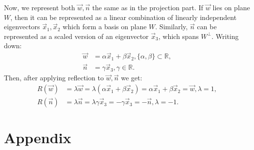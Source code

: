 \documentclass{article}
\begin{document}
Now, we represent both $\vec{w},\vec{n}$ the same as in the projection part. If $\vec{w}$ lies on plane $W$, then it can be represented as a linear combination of linearly independent eigenvectors $\vec{x}_1,\vec{x}_2$ which form a basis on plane $W$. Similarly, $\vec{n}$ can be represented as a scaled version of an eigenvector $\vec{x}_3$, which spans $W^\perp$. Writing down:
\begin{align*}
	\vec{w}&=\alpha\vec{x}_1+\beta\vec{x}_2,\{\alpha,\beta\}\subset \mathbb{R},\\
	\vec{n}&=\gamma\vec{x}_3,\gamma\in\mathbb{R}.
\end{align*}
Then, after applying reflection to $\vec{w},\vec{n}$ we get:
\begin{align*}
	R(\vec{w})&=\lambda\vec{w}=\lambda\left(\alpha\vec{x}_1+\beta\vec{x}_2\right)=\alpha\vec{x}_1+\beta\vec{x}_2=\vec{w},\lambda=1,\\
	R(\vec{n})&=\lambda\vec{n}=\lambda\gamma\vec{x}_3=-\gamma\vec{x}_3=-\vec{n},\lambda=-1.
\end{align*}






\appendix

\section{Appendix}
\end{document}
